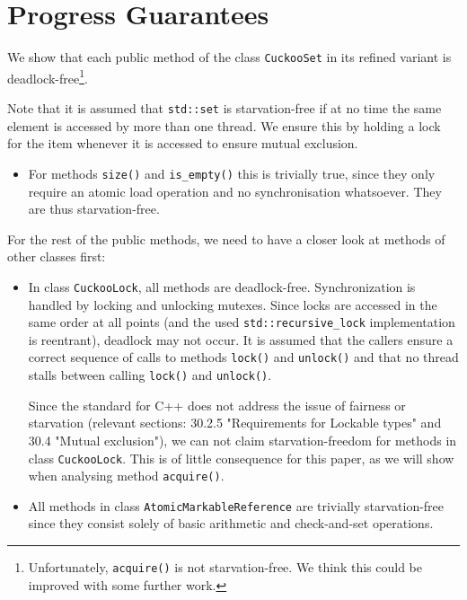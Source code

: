 \documentclass[a4paper,10pt]{article}
\begin{document}
\section{Progress Guarantees}
\label{sec:progressGuarantees}

We show that each public method of the class \lstinline|CuckooSet| in its
refined variant is deadlock-free\footnote{Unfortunately, \lstinline|acquire()|
is not starvation-free. We think this could be improved with some further
work.}.

Note that it is assumed that \lstinline|std::set| is
starvation-free if at no time the same element is accessed by more than one
thread. We ensure this by holding a lock for the item whenever it is accessed
to ensure mutual exclusion.

\begin{itemize}
\item For methods \lstinline|size()| and \lstinline|is_empty()| this is
    trivially true, since they only require an atomic load operation and no
    synchronisation whatsoever. They are thus starvation-free.
\end{itemize}

For the rest of the public methods, we need to have a closer look at methods of
other classes first:

\begin{itemize}
\item In class \lstinline|CuckooLock|, all methods are deadlock-free.
    Synchronization is handled by locking and unlocking mutexes. Since locks
    are accessed in the same order at all points (and the used
    \lstinline|std::recursive_lock| implementation is reentrant), deadlock may
    not occur. It is assumed that the callers ensure a correct sequence of
    calls to methods \lstinline|lock()| and \lstinline|unlock()| and that no
    thread stalls between calling \lstinline|lock()| and \lstinline|unlock()|.

    Since the standard for C++ \cite{cppstandard} does not address the issue of
    fairness or starvation (relevant sections: 30.2.5 "Requirements for Lockable
    types" and 30.4 "Mutual exclusion"), we can not claim starvation-freedom for
    methods in class \lstinline|CuckooLock|. This is of little consequence for this
    paper, as we will show when analysing method \lstinline|acquire()|.

\item All methods in class \lstinline|AtomicMarkableReference| are trivially
    starvation-free since they consist solely of basic arithmetic and check-and-set
    operations.
\end{itemize}
\end{document}
